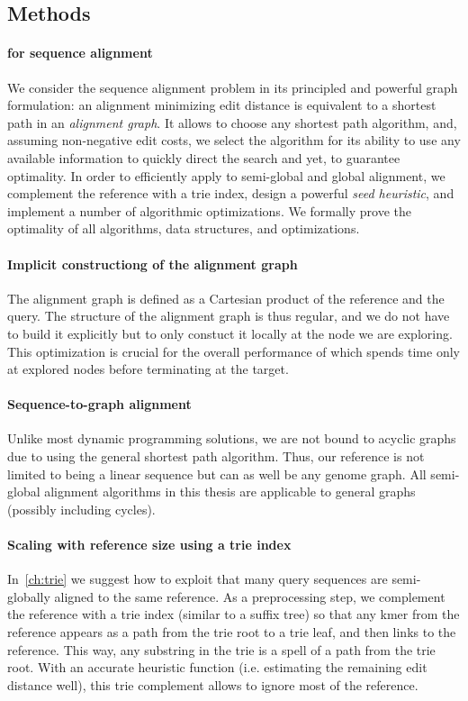 \subsection*{Methods}

\paragraph{\A for sequence alignment}
We consider the sequence alignment problem in its principled and powerful graph
formulation: an alignment minimizing edit distance is equivalent to a shortest
path in an \emph{alignment graph}. It allows to choose any shortest path
algorithm, and, assuming non-negative edit costs, we select the \A algorithm for
its ability to use any available information to quickly direct the search and
yet, to guarantee optimality. In order to efficiently apply \A to semi-global
and global alignment, we complement the reference with a trie index, design a
powerful \emph{seed heuristic}, and implement a number of algorithmic
optimizations. We formally prove the optimality of all algorithms, data
structures, and optimizations.

\paragraph{Implicit constructiong of the alignment graph}
The alignment graph is defined as a Cartesian product of the reference and the
query. The structure of the alignment graph is thus regular, and we do not have
to build it explicitly but to only constuct it locally at the node we are
exploring. This optimization is crucial for the overall performance of \A which
spends time only at explored nodes before terminating at the target.

\paragraph{Sequence-to-graph alignment}
Unlike most dynamic programming solutions, we are not bound to acyclic graphs
due to using the general \A shortest path algorithm. Thus, our reference is not
limited to being a linear sequence but can as well be any genome graph. All
semi-global alignment algorithms in this thesis are applicable to general graphs
(possibly including cycles).

\paragraph{Scaling with reference size using a trie index}
In~\cref{ch:trie} we suggest how to exploit that many query sequences are
semi-globally aligned to the same reference. As a preprocessing step, we
complement the reference with a trie index (similar to a suffix tree) so that
any kmer from the reference appears as a path from the trie root to a trie leaf,
and then links to the reference. This way, any substring in the trie is a spell
of a path from the trie root. With an accurate heuristic function (i.e.
estimating the remaining edit distance well), this trie complement allows to
ignore most of the reference.

